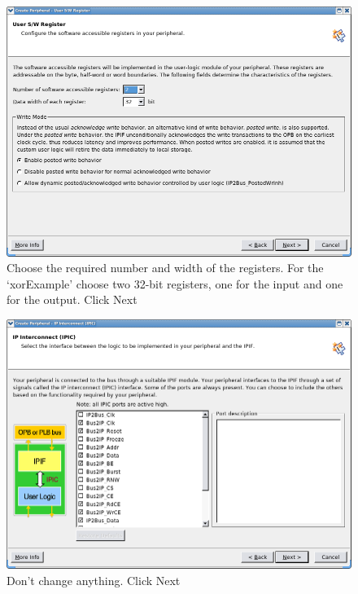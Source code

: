 \documentclass[a4paper,oneside]{memoir}
\begin{document}
\begin{figure}[H]
\centering
\includegraphics[scale=0.5]{COIP7}
\caption{Choose the required number and width of the registers. For the `xorExample' choose two 32-bit registers, one for the input and one for the output. Click Next\label{fig:COIP7}}
\end{figure}
\begin{figure}[H]
\centering
\includegraphics[scale=0.5]{COIP8}
\caption{Don't change anything. Click Next\label{fig:COIP8}}
\end{figure}
\end{document}
